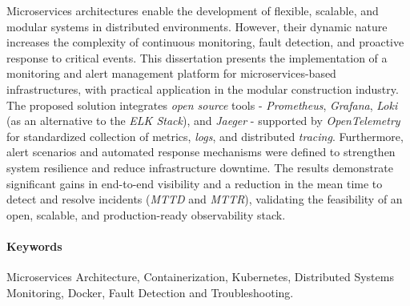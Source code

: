 Microservices architectures enable the development of flexible, scalable, and modular systems in distributed environments. However, their dynamic nature increases the complexity of continuous monitoring, fault detection, and proactive response to critical events.
This dissertation presents the implementation of a monitoring and alert management platform for microservices-based infrastructures, with practical application in the modular construction industry. The proposed solution integrates \textit{open source} tools - \textit{Prometheus}, \textit{Grafana}, \textit{Loki} (as an alternative to the \textit{ELK Stack}), and \textit{Jaeger} - supported by \textit{OpenTelemetry} for standardized collection of metrics, \textit{logs}, and distributed \textit{tracing}.
Furthermore, alert scenarios and automated response mechanisms were defined to strengthen system resilience and reduce infrastructure downtime.
The results demonstrate significant gains in end-to-end visibility and a reduction in the mean time to detect and resolve incidents (\textit{MTTD} and \textit{MTTR}), validating the feasibility of an open, scalable, and production-ready observability stack.



\paragraph{Keywords} Microservices Architecture, Containerization, Kubernetes, Distributed Systems Monitoring, Docker, Fault Detection and Troubleshooting.

\cleardoublepage
